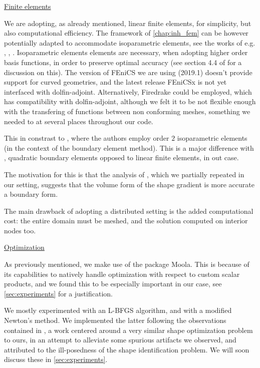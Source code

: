\documentclass[english,a4paper,9pt,oneside]{scrbook}	%
\theoremstyle{break}
\theoremstyle{remark}
\begin{document}
\underline{Finite elements}

We are adopting, as already mentioned, linear finite elements, for simplicity, but also computational efficiency. The framework of \cref{chap:inh_fem} can be however potentially adapted to accommodate isoparametric elements, see the works of e.g. \cite{edelmann}, \cite{elliott}, \cite{ranner}. Isoparametric elements elements are necessary, when adopting higher order basis functions, in order to preserve optimal accuracy (see section 4.4 of \cite{strang} for a discussion on this). The version of FEniCS we are using (2019.1) doesn't provide support for curved geometries, and the latest release FEniCSx is not yet interfaced with dolfin-adjoint. Alternatively, Firedrake could be employed, which has compatibility with dolfin-adjoint, although we felt it to be not flexible enough with the transfering of functions between non conforming meshes, something we needed to at several places throughout our code.

This in constrast to \cite{harbrecht}, where the authors employ order $2$ isoparametric elements (in the context of the boundary element method). This is a major difference with \cite{harbrecht}, quadratic boundary elements opposed to linear finite elements, in out case.

The motivation for this is that the analysis of \cite{paganini}, which we partially repeated in our setting, suggests that the volume form of the shape gradient is more accurate a boundary form. 

The main drawback of adopting a distributed setting is the added computational cost: the entire domain must be meshed, and the solution computed on interior nodes too.

\underline{Optimization}

As previously mentioned, we make use of the package Moola. This is because of its capabilities to natively handle optimization with respect to custom scalar products, and we found this to be especially important in our case, see \cref{sec:experiments} for a justification.

We mostly experimented with an L-BFGS algorithm, and with a modified Newton's method. We implemented the latter following the observations contained in \cite{eppler}, a work centered around a very similar shape optimization problem to ours, in an attempt to alleviate some spurious artifacts we observed, and attributed to the ill-posedness of the shape identification problem. We will soon discuss these in \cref{sec:experiments}.
\end{document}
